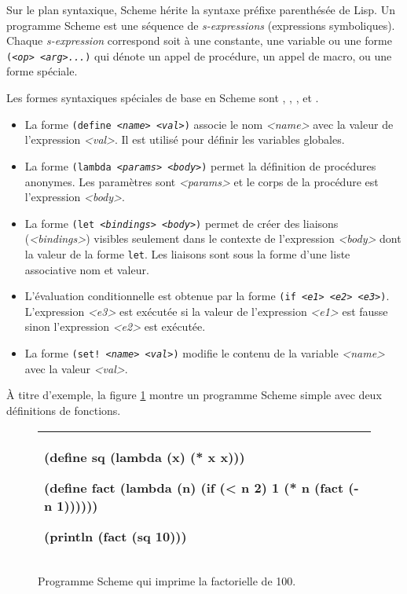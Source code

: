 Sur le plan syntaxique, Scheme hérite la
syntaxe préfixe parenthésée de Lisp.  Un programme Scheme est une séquence de
\textit{s-expressions} (expressions symboliques).  Chaque \textit{s-expression} correspond soit à une
constante, une variable ou une forme \texttt{(\textit{<op>} \textit{<arg>...})}
qui dénote un appel de procédure, un appel de macro, ou une forme spéciale.

Les formes syntaxiques spéciales de base en Scheme sont , ,
,  et .
\begin{itemize}
  \item La forme \texttt{(define \textit{<name>} \textit{<val>})} associe le nom \textit{<name>} avec
    la valeur de l'expression \textit{<val>}. Il est utilisé pour définir les variables globales.

  \item La forme \texttt{(lambda \textit{<params>} \textit{<body>})} permet la définition de
    procédures anonymes. Les paramètres sont \textit{<params>} et le corps
    de la procédure est l'expression \textit{<body>}.

  \item La forme \texttt{(let \textit{<bindings>} \textit{<body>})} permet de
    créer des liaisons (\textit{<bindings>}) visibles seulement dans le
    contexte de l'expression \textit{<body>} dont la valeur de la forme
    \texttt{let}. Les liaisons sont sous la forme d'une liste associative
    nom et valeur.

  \item L'évaluation conditionnelle est obtenue par la forme \texttt{(if
    \textit{<e1>} \textit{<e2>} \textit{<e3>})}.  L'expression \textit{<e3>}
    est exécutée si la valeur de l'expression \textit{<e1>} est fausse sinon
    l'expression \textit{<e2>} est exécutée.

  \item La forme \texttt{(set! \textit{<name>} \textit{<val>})} modifie le contenu de la variable
    \textit{<name>} avec la valeur \textit{<val>}.
\end{itemize}

À titre d'exemple, la figure \ref{fig:fact100} montre un programme Scheme
simple avec deux définitions de fonctions.
\begin{figure}[htbp]
  \begin{tabular}{|l|}\hline
\begin{mplisting}{0.7}
(define sq (lambda (x) (* x x)))

(define fact
  (lambda (n)
    (if (< n 2)
        1
        (* n (fact (- n 1))))))

(println (fact (sq 10)))
\end{mplisting}\\\hline
\end{tabular}

\caption{Programme Scheme qui imprime la factorielle de 100.}

\label{fig:fact100}
\end{figure}


